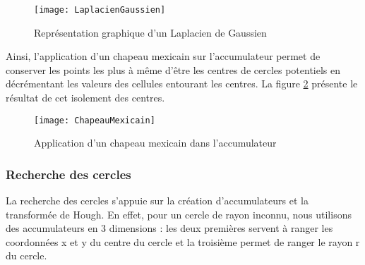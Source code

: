 \begin{figure}[H]
  \centering
  \texttt{[image: LaplacienGaussien]}
  \caption{Représentation graphique d’un Laplacien de Gaussien}
  \label{fig:LaplacienGaussien}
\end{figure}

Ainsi, l’application d’un chapeau mexicain sur l’accumulateur permet de conserver les points les plus à même d’être les centres de cercles potentiels en décrémentant les valeurs des cellules entourant les centres. La figure \ref{fig:ChapeauMexicain} présente le résultat de cet isolement des centres.

\begin{figure}[H]
  \centering
  \texttt{[image: ChapeauMexicain]}
  \caption{Application d’un chapeau mexicain dans l’accumulateur}
  \label{fig:ChapeauMexicain}
\end{figure}

\subsubsection{Recherche des cercles}

La recherche des cercles s’appuie sur la création d’accumulateurs et la transformée de Hough. En effet, pour un cercle de rayon inconnu, nous utilisons des accumulateurs en 3 dimensions : les deux premières servent à ranger les coordonnées x et y du centre du cercle et la troisième permet de ranger le rayon r du cercle. 


